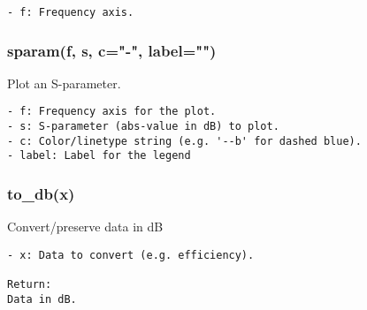 \begin{verbatim}
- f: Frequency axis.
\end{verbatim}

\subsubsection{sparam(f, s, c="-", label="")}
Plot an S-parameter.

\begin{verbatim}
- f: Frequency axis for the plot.
- s: S-parameter (abs-value in dB) to plot.
- c: Color/linetype string (e.g. '--b' for dashed blue).
- label: Label for the legend
\end{verbatim}

\subsubsection{to\_db(x)}
Convert/preserve data in dB

\begin{verbatim}
- x: Data to convert (e.g. efficiency).

Return:
Data in dB.
\end{verbatim}

